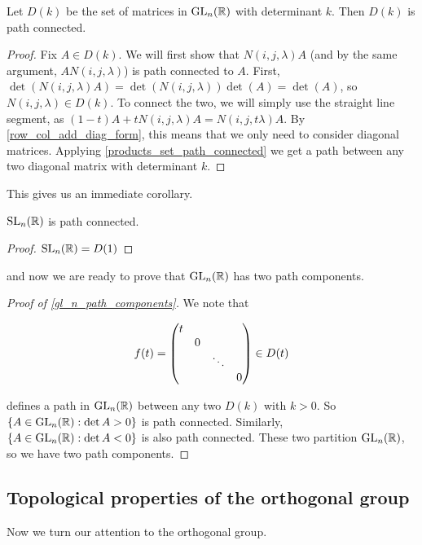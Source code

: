 \documentclass{article}
\begin{document}
    \begin{lemma}
        Let $D(k)$ be the set of matrices in $\operatorname{GL}_n(\mathbb{R})$ with determinant $k$. Then $D(k)$ is path connected.
    \end{lemma}

    \begin{proof}
        Fix $A \in D(k)$. We will first show that $N(i, j, \lambda)A$ (and by the same argument, $A N(i,j, \lambda)$) is path connected to $A$. First, $\det(N(i,j, \lambda)A) = \det(N(i,j,\lambda)) \det(A) = \det(A)$, so $N(i,j, \lambda) \in D(k)$. To connect the two, we will simply use the straight line segment, as $(1 - t)A + tN(i, j, \lambda)A = N(i, j, t\lambda)A$. By \cref{row_col_add_diag_form}, this means that we only need to consider diagonal matrices. Applying \cref{products_set_path_connected} we get a path between any two diagonal matrix with determinant $k$.
    \end{proof}

    This gives us an immediate corollary.

    \begin{corollary}
        \label{sl_n_path_connected}
        $\operatorname{SL}_n(\mathbb{R})$ is path connected.
    \end{corollary}

    \begin{proof}
        $\operatorname{SL}_n(\mathbb{R}) = D(1)$
    \end{proof}

    and now we are ready to prove that $\operatorname{GL}_n(\mathbb{R})$ has two path components.
    
    \begin{proof}
        [Proof of \cref{gl_n_path_components}]

        We note that 
        
        $$f(t) = \mqty(\dmat{t, 0, \ddots, 0}) \in D(t)$$

        defines a path in $\operatorname{GL}_n(\mathbb{R})$ between any two $D(k)$ with $k > 0$. So $\{A \in \operatorname{GL}_n(\mathbb{R}) : \det A > 0\}$ is path connected. Similarly, $\{A \in \operatorname{GL}_n(\mathbb{R}) : \det A < 0\}$ is also path connected. These two partition $\operatorname{GL}_n(\mathbb{R})$, so we have two path components.
    \end{proof}

    \subsection{Topological properties of the orthogonal group}

    Now we turn our attention to the orthogonal group.
\end{document}
